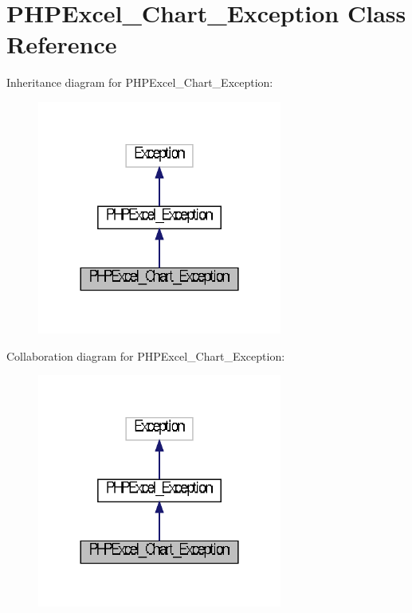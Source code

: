 \section{P\+H\+P\+Excel\+\_\+\+Chart\+\_\+\+Exception Class Reference}
\label{class_p_h_p_excel___chart___exception}


Inheritance diagram for P\+H\+P\+Excel\+\_\+\+Chart\+\_\+\+Exception\+:\nopagebreak
\begin{figure}[H]
\begin{center}
\leavevmode
\includegraphics[width=228pt]{class_p_h_p_excel___chart___exception__inherit__graph}
\end{center}
\end{figure}


Collaboration diagram for P\+H\+P\+Excel\+\_\+\+Chart\+\_\+\+Exception\+:\nopagebreak
\begin{figure}[H]
\begin{center}
\leavevmode
\includegraphics[width=228pt]{class_p_h_p_excel___chart___exception__coll__graph}
\end{center}
\end{figure}
